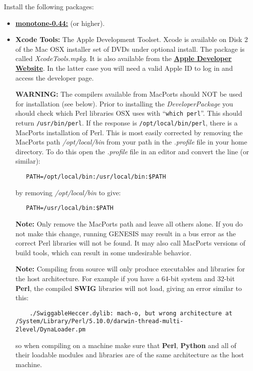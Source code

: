 \documentclass[12pt]{article}
\begin{document}
Install the following packages:
\begin{itemize}
   \item[]\href{http://monotone.ca/}{\bf monotone-0.44:} (or higher).
   \item[]{\bf Xcode Tools:} The Apple Development Toolset. Xcode is available on Disk 2 of the Mac OSX installer set of DVDs under optional install. The package is called {\it  XcodeTools.mpkg}. It is also available from the \href{http://developer.apple.com/technology/xcode.html}{\bf Apple Developer Website}. In the latter case  you will need a valid Apple ID to log in and access the developer page.
   
   {\bf WARNING:} The compilers available from MacPorts should NOT be used for installation (see below). Prior to installing the {\it DeveloperPackage} you should check which Perl libraries OSX uses with ``{\tt  which perl}''. This should return {\tt  /usr/bin/perl}. If the response is {\tt /opt/local/bin/perl}, there is a MacPorts installation of Perl. This is most easily corrected by removing the MacPorts path {\it /opt/local/bin} from your path in the {\it .profile} file in your home directory. To do this open the  {\it .profile} file in an editor and convert the line (or similar):
\begin{verbatim}
   PATH=/opt/local/bin:/usr/local/bin:$PATH
\end{verbatim}
by removing {\it /opt/local/bin} to give:
\begin{verbatim}
   PATH=/usr/local/bin:$PATH
\end{verbatim}
{\bf Note:} Only remove the MacPorts path and leave all others alone. If you do not make this change, running GENESIS may result in a bus error as the correct Perl libraries will not be found. It may also call MacPorts versions of build tools, which can result in some undesirable behavior.  

 {\bf Note:} Compiling from source will only produce executables and libraries for the host architecture. For example if you have a 64-bit system and 32-bit {\bf Perl}, the compiled {\bf SWIG} libraries will not load, giving an error similar to this:

\begin{verbatim}
	./SwiggableHeccer.dylib: mach-o, but wrong architecture at /System/Library/Perl/5.10.0/darwin-thread-multi-2level/DynaLoader.pm
\end{verbatim}
   
so when compiling on a machine make sure that {\bf Perl}, {\bf Python} and all of their loadable modules and libraries are of the same architecture as the host machine.


\end{itemize}
\end{document}
